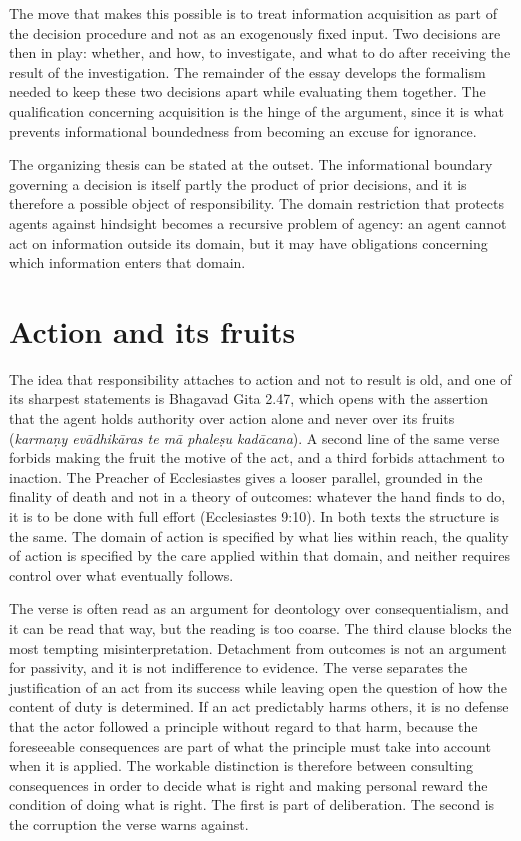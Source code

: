 \documentclass[11pt]{article}
\theoremstyle{definition}
\begin{document}
The move that makes this possible is to treat information acquisition as part of the decision procedure and not as an exogenously fixed input. Two decisions are then in play: whether, and how, to investigate, and what to do after receiving the result of the investigation. The remainder of the essay develops the formalism needed to keep these two decisions apart while evaluating them together. The qualification concerning acquisition is the hinge of the argument, since it is what prevents informational boundedness from becoming an excuse for ignorance.

The organizing thesis can be stated at the outset. The informational boundary governing a decision is itself partly the product of prior decisions, and it is therefore a possible object of responsibility. The domain restriction that protects agents against hindsight becomes a recursive problem of agency: an agent cannot act on information outside its domain, but it may have obligations concerning which information enters that domain.

\section{Action and its fruits}

The idea that responsibility attaches to action and not to result is old, and one of its sharpest statements is Bhagavad Gita 2.47, which opens with the assertion that the agent holds authority over action alone and never over its fruits (\emph{karmaṇy evādhikāras te mā phaleṣu kadācana}). A second line of the same verse forbids making the fruit the motive of the act, and a third forbids attachment to inaction. The Preacher of Ecclesiastes gives a looser parallel, grounded in the finality of death and not in a theory of outcomes: whatever the hand finds to do, it is to be done with full effort (Ecclesiastes 9:10). In both texts the structure is the same. The domain of action is specified by what lies within reach, the quality of action is specified by the care applied within that domain, and neither requires control over what eventually follows.

The verse is often read as an argument for deontology over consequentialism, and it can be read that way, but the reading is too coarse. The third clause blocks the most tempting misinterpretation. Detachment from outcomes is not an argument for passivity, and it is not indifference to evidence. The verse separates the justification of an act from its success while leaving open the question of how the content of duty is determined. If an act predictably harms others, it is no defense that the actor followed a principle without regard to that harm, because the foreseeable consequences are part of what the principle must take into account when it is applied. The workable distinction is therefore between consulting consequences in order to decide what is right and making personal reward the condition of doing what is right. The first is part of deliberation. The second is the corruption the verse warns against.
\end{document}
